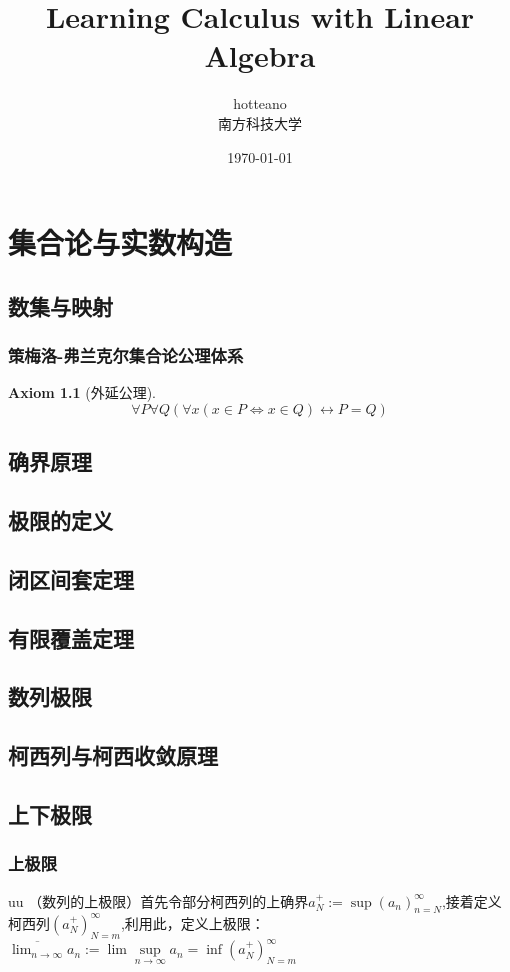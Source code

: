 \documentclass[12pt,a4paper,UTF8]{ctexbook}
\title{Learning Calculus with Linear Algebra}
\author{hotteano\\
        南方科技大学}
\date{\today }
\theoremstyle{plain}
\newtheorem{axiom}{\indent Axiom}[section]
\begin{document}
\maketitle
\tableofcontents

\chapter{集合论与实数构造}  
\section{数集与映射}
\subsection{策梅洛-弗兰克尔集合论公理体系}
\begin{axiom}[外延公理]
    \begin{equation}
        \forall P \forall Q \left( \forall x (x\in P \Leftrightarrow x\in Q) \leftrightarrow  P=Q \right)
    \end{equation}
\end{axiom}


\section{确界原理}
\section{极限的定义}
\section{闭区间套定理}
\section{有限覆盖定理}
\section{数列极限}

\section{柯西列与柯西收敛原理}
\section{上下极限}
\subsection{上极限}uu
（数列的上极限）首先令部分柯西列的上确界$a^{+}_N:=\sup(a_n)^\infty_{n=N}$,接着定义柯西列$(a_N^{+})^\infty_{N=m}$,利用此，定义上极限： $\overline{\lim_{n\to\infty}}a_n:=\lim \underset{n\to \infty}{\sup}a_n=\inf (a_N^{+})^\infty_{N=m}$
\end{document}
